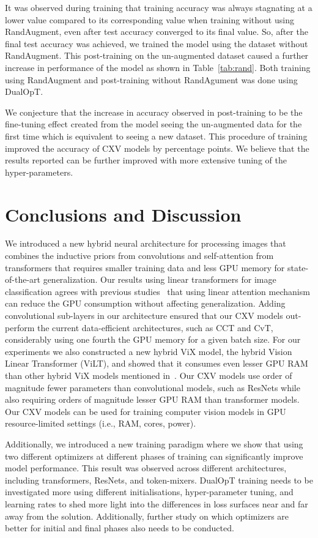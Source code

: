 \documentclass{article}
\begin{document}
It was observed during training that training accuracy was always stagnating at a lower value compared to its corresponding value when training without using RandAugment, even after test accuracy converged to its final value. So, after the final test accuracy was achieved, we trained the model using the dataset without RandAugment. This post-training on the un-augmented dataset caused a further increase in performance of the model as shown in Table~\ref{tab:rand}. Both training using RandAugment and post-training without RandAgument was done using DualOpT. 

We conjecture that the increase in accuracy observed in post-training to be the fine-tuning effect created from the model seeing the un-augmented data for the first time which is equivalent to seeing a new dataset. This procedure of training improved the accuracy of CXV models by  percentage points. We believe that the results reported can be further improved with more extensive tuning of the hyper-parameters. 

\section{Conclusions and Discussion}
We introduced a new hybrid neural architecture for processing images that combines the inductive priors from convolutions and self-attention from transformers that requires smaller training data and less GPU memory for state-of-the-art generalization. Our results using linear transformers for image classification agrees with previous studies~\cite{jeevan2021vision} that using linear attention mechanism can reduce the GPU consumption without affecting generalization. Adding convolutional sub-layers in our architecture ensured that our CXV models out-perform the current data-efficient architectures, such as CCT and CvT, considerably using one fourth the GPU memory for a given batch size. For our experiments we also constructed a new hybrid ViX model, the hybrid Vision Linear Transformer (ViLT), and showed that it consumes even lesser GPU RAM than other hybrid ViX models mentioned in~\cite{jeevan2021vision}. Our CXV models use order of magnitude fewer parameters than convolutional models, such as ResNets while also requiring orders of magnitude lesser GPU RAM than transformer models. Our CXV models can be used for training computer vision models in GPU resource-limited settings (i.e., RAM, cores, power).

Additionally, we introduced a new training paradigm where we show that using two different optimizers at different phases of training can significantly improve model performance. This result was observed across different architectures, including transformers, ResNets, and token-mixers. DualOpT training needs to be investigated more using different initialisations, hyper-parameter tuning, and learning rates to shed more light into the differences in loss surfaces near and far away from the solution. Additionally, further study on which optimizers are better for initial and final phases also needs to be conducted.  
\end{document}
